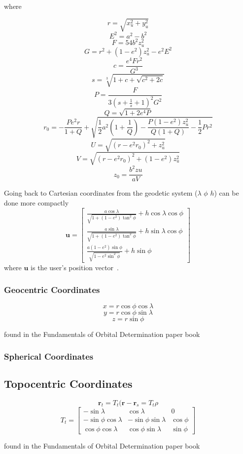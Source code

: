 \begin{bibunit}
where

\[ r = \sqrt{x_{u}^{2}+y_{u}^{2}} \]
\[ E^{2} = a^{2} - b^{2} \]
\[ F = 54 b^{2} z_{u}^{2} \]
\[ G = r^{2} + (1-e^{2}) z_{u}^{2} - e^{2} E^{2} \]
\[ c = \frac{e^{4} F r^{2}}{G^{3}} \]
\[ s = \sqrt[3]{1+c+\sqrt{c^{2} + 2c}}\]
\[ P = \frac{F}{3 \left( s + \frac{1}{s} + 1  \right)^{2}G^{2} } \]
\[ Q = \sqrt{1+2e^{4}P} \]
\[ r_{0} = -\frac{Pe^{2}r}{1+Q}+\sqrt{\frac{1}{2}a^{2} \left(1+\frac{1}{Q}\right)-\frac{P(1-e^{2})z_{u}^{2}}{Q(1+Q)}-\frac{1}{2}Pr^{2}}\]
\[ U = \sqrt{(r-e^{2}r_{0})^{2}+z_{u}^{2}}\]
\[ V = \sqrt{(r-e^{2}r_{0})^{2}+(1-e^{2})z_{u}^{2}} \]
\[ z_{0} = \frac{b^{2}z{u}}{aV} \]

Going back to Cartesian coordinates from the geodetic system ($\lambda$ $\phi$ $h$) can be done more compactly
\[ \mathbf{u} = \left[  \begin{array}{c}
\frac{a\cos\lambda}{\sqrt{1+(1-e^2)\tan^{2}\phi}}+h\cos\lambda\cos\phi \\
\frac{a\sin\lambda}{\sqrt{1+(1-e^2)\tan^{2}\phi}}+h\sin\lambda\cos\phi \\
\frac{a(1-e^{2})\sin\phi}{\sqrt{1-e^{2}\sin^{2}\phi}}+h\sin\phi
\end{array}
\right] \]
where $\mathbf{u}$ is the user's position vector~\cite[pp. 26-28, p. 76]{kaplan:ugpspa,me:gsmp}.

\subsubsection{Geocentric Coordinates}
\[x=r\cos\phi\cos\lambda\]
\[y=r\cos\phi\sin\lambda\]
\[z=r\sin\phi\]

found in the Fundamentals of Orbital Determination paper book

\subsubsection{Spherical Coordinates}

\subsection{Topocentric Coordinates}
\[\mathbf{r}_{t}=T_{t}(\mathbf{r}-\mathbf{r}_{s}=T_{t}\rho\]
\[T_{t}=\left[ \begin{array}{ccc}
-\sin\lambda & \cos\lambda & 0 \\
-\sin\phi\cos\lambda & -\sin\phi\sin\lambda & \cos\phi \\
\cos\phi\cos\lambda & \cos\phi\sin\lambda & \sin\phi \end{array} \right] \]

found in the Fundamentals of Orbital Determination paper book

\end{bibunit}
%
